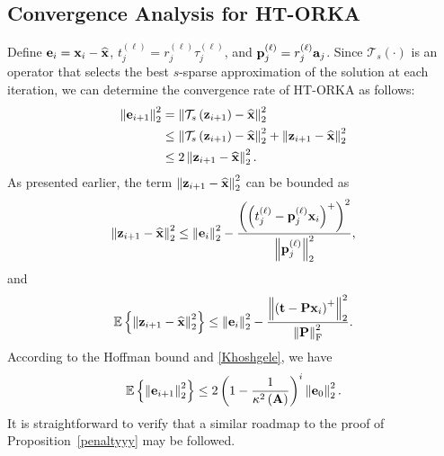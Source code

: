 \documentclass[12pt,draftcls,onecolumn]{IEEEtran}
\begin{document}
\subsection{Convergence Analysis for HT-ORKA}
\label{htt_orka}
Define $\mathbf{e}_i=\mathbf{x}_i-\widehat{\mathbf{x}}$, $t^{(\ell)}_{j}=r^{(\ell)}_j\tau^{(\ell)}_j$, and $\mathbf{p}^{(\ell)}_j=r^{(\ell)}_j\mathbf{a}_j$. Since $\mathcal{T}_{s}(\cdot)$ is an operator that selects the best $s$-sparse approximation of the solution at each iteration, we can determine the convergence rate of HT-ORKA as follows:
\begin{equation}
\label{Khoshgele}
\begin{aligned}
\left\|\mbe_{i+1}\right\|^2_2&=\left\|\mathcal{T}_{s}\left(\mbz_{i+1}\right)-\widehat{\mbx}\right\|^2_2\\ &\leq\left\|\mathcal{T}_{s}\left(\mbz_{i+1}\right)-\widehat{\mbx}\right\|^2_2+\left\|\mbz_{i+1}-\widehat{\mbx}\right\|^2_2\\
&\leq 2 \left\|\mbz_{i+1}-\widehat{\mbx}\right\|^2_2.
\end{aligned}
\end{equation}
As presented earlier, the term $\left\|\mathbf{z}_{i+1}-\widehat{\mathbf{x}}\right\|^2_2$ can be bounded as 
\begin{equation}
\begin{aligned}
\left\|\mathbf{z}_{i+1}-\widehat{\mathbf{x}}\right\|^2_2
\leq \left\|\mathbf{e}_i\right\|^2_2-\frac{\left(\left(t^{(\ell)}_j-\mathbf{p}^{(\ell)}_j\mathbf{x}_{i}\right)^+\right)^2}{\left\|\mathbf{p}^{(\ell)}_j\right\|^2_2},
\end{aligned}
\end{equation} \normalsize
and
\begin{equation}
\begin{aligned}
\mathbb{E}\left\{\left\|\mathbf{z}_{i+1}-\widehat{\mathbf{x}}\right\|^2_2\right\}\leq \left\|\mathbf{e}_i\right\|^2_2-\frac{\left\|\left(\mathbf{t}-\mathbf{P}\mathbf{x}_{i}\right)^+\right\|^2_2}{\left\|\mathbf{P}\right\|^2_{\mathrm{F}}}.
\end{aligned}
\end{equation}
According to the Hoffman bound \cite[Theorem~4.2]{leventhal2010randomized} and \eqref{Khoshgele}, we have
\begin{equation}
\label{khoshgele1}
\begin{aligned}
\mathbb{E}\left\{\left\|\mathbf{e}_{i+1}\right\|^2_2\right\}\leq2\left(1-\frac{1}{\kappa^{2}\left(\mbA\right)}\right)^{i} \left\|\mbe_0\right\|^2_2.
\end{aligned}
\end{equation}
It is straightforward to verify that a similar roadmap to the proof of Proposition~\ref{penaltyyy} may be followed.
\end{document}
